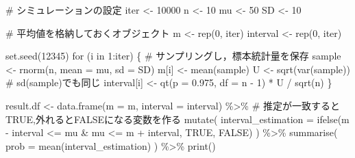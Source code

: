 \documentclass[
  a4paper,
]{book}
\newenvironment{Shaded}{\begin{snugshade}}{\end{snugshade}}
\newcommand{\AttributeTok}[1]{\textcolor[rgb]{0.40,0.45,0.13}{#1}}
\newcommand{\CommentTok}[1]{\textcolor[rgb]{0.37,0.37,0.37}{#1}}
\newcommand{\ConstantTok}[1]{\textcolor[rgb]{0.56,0.35,0.01}{#1}}
\newcommand{\ControlFlowTok}[1]{\textcolor[rgb]{0.00,0.23,0.31}{#1}}
\newcommand{\DecValTok}[1]{\textcolor[rgb]{0.68,0.00,0.00}{#1}}
\newcommand{\FloatTok}[1]{\textcolor[rgb]{0.68,0.00,0.00}{#1}}
\newcommand{\FunctionTok}[1]{\textcolor[rgb]{0.28,0.35,0.67}{#1}}
\newcommand{\NormalTok}[1]{\textcolor[rgb]{0.00,0.23,0.31}{#1}}
\newcommand{\OtherTok}[1]{\textcolor[rgb]{0.00,0.23,0.31}{#1}}
\newcommand{\SpecialCharTok}[1]{\textcolor[rgb]{0.37,0.37,0.37}{#1}}
\begin{document}
\begin{Shaded}
\begin{Highlighting}[]
\CommentTok{\# シミュレーションの設定}
\NormalTok{iter }\OtherTok{\textless{}{-}} \DecValTok{10000}
\NormalTok{n }\OtherTok{\textless{}{-}} \DecValTok{10}
\NormalTok{mu }\OtherTok{\textless{}{-}} \DecValTok{50}
\NormalTok{SD }\OtherTok{\textless{}{-}} \DecValTok{10}

\CommentTok{\# 平均値を格納しておくオブジェクト}
\NormalTok{m }\OtherTok{\textless{}{-}} \FunctionTok{rep}\NormalTok{(}\DecValTok{0}\NormalTok{, iter)}
\NormalTok{interval }\OtherTok{\textless{}{-}} \FunctionTok{rep}\NormalTok{(}\DecValTok{0}\NormalTok{, iter)}

\FunctionTok{set.seed}\NormalTok{(}\DecValTok{12345}\NormalTok{)}
\ControlFlowTok{for}\NormalTok{ (i }\ControlFlowTok{in} \DecValTok{1}\SpecialCharTok{:}\NormalTok{iter) \{}
  \CommentTok{\# サンプリングし，標本統計量を保存}
\NormalTok{  sample }\OtherTok{\textless{}{-}} \FunctionTok{rnorm}\NormalTok{(n, }\AttributeTok{mean =}\NormalTok{ mu, }\AttributeTok{sd =}\NormalTok{ SD)}
\NormalTok{  m[i] }\OtherTok{\textless{}{-}} \FunctionTok{mean}\NormalTok{(sample)}
\NormalTok{  U }\OtherTok{\textless{}{-}} \FunctionTok{sqrt}\NormalTok{(}\FunctionTok{var}\NormalTok{(sample)) }\CommentTok{\# sd(sample)でも同じ}
\NormalTok{  interval[i] }\OtherTok{\textless{}{-}} \FunctionTok{qt}\NormalTok{(}\AttributeTok{p =} \FloatTok{0.975}\NormalTok{, }\AttributeTok{df =}\NormalTok{ n }\SpecialCharTok{{-}} \DecValTok{1}\NormalTok{) }\SpecialCharTok{*}\NormalTok{ U }\SpecialCharTok{/} \FunctionTok{sqrt}\NormalTok{(n)}
\NormalTok{\}}

\NormalTok{result.df }\OtherTok{\textless{}{-}} \FunctionTok{data.frame}\NormalTok{(}\AttributeTok{m =}\NormalTok{ m, }\AttributeTok{interval =}\NormalTok{ interval) }\SpecialCharTok{\%\textgreater{}\%}
  \CommentTok{\# 推定が一致するとTRUE,外れるとFALSEになる変数を作る}
  \FunctionTok{mutate}\NormalTok{(}
    \AttributeTok{interval\_estimation =} \FunctionTok{ifelse}\NormalTok{(m }\SpecialCharTok{{-}}\NormalTok{ interval }\SpecialCharTok{\textless{}=}\NormalTok{ mu }\SpecialCharTok{\&}\NormalTok{ mu }\SpecialCharTok{\textless{}=}\NormalTok{ m }\SpecialCharTok{+}\NormalTok{ interval, }\ConstantTok{TRUE}\NormalTok{, }\ConstantTok{FALSE}\NormalTok{)}
\NormalTok{  ) }\SpecialCharTok{\%\textgreater{}\%}
  \FunctionTok{summarise}\NormalTok{(}
    \AttributeTok{prob =} \FunctionTok{mean}\NormalTok{(interval\_estimation)}
\NormalTok{  ) }\SpecialCharTok{\%\textgreater{}\%}
  \FunctionTok{print}\NormalTok{()}
\end{Highlighting}
\end{Shaded}
\end{document}
